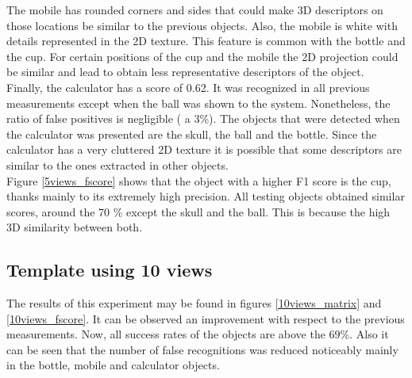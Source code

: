 	The mobile has rounded corners and sides that could make 3D descriptors on those locations be similar to the previous objects. 
	Also, the mobile is white with details represented in the 2D texture. 
	This feature is common with the bottle and the cup. 
	For certain positions of the cup and the mobile the 2D projection could be similar and lead to obtain less representative descriptors of the object. 
	\\
	Finally, the calculator has a score of 0.62. 
	It was recognized in all previous measurements except when the ball was shown to the system. 
	Nonetheless, the ratio of false positives is negligible ( a 3\%). 
	The objects that were detected when the calculator was presented are the skull, the ball and the bottle. 
	Since the calculator has a very cluttered 2D texture it is possible that some descriptors are similar to the ones extracted in other objects. 
	\\

	Figure \ref{5views_fscore} shows that the object with a higher F1 score is the cup, thanks mainly to its extremely high precision.  
	All testing objects obtained similar scores, around the 70 \% except the skull and the ball. 
	This is because the high 3D similarity between both. 


	\subsection{Template using 10 views}
	The results of this experiment may be found in figures \ref{10views_matrix} and \ref{10views_fscore}. 
	It can be observed an improvement with respect to the previous measurements. 
	Now, all success rates of the objects are above the 69\%. 
	Also it can be seen that the number of false recognitions was reduced noticeably mainly in the bottle, mobile and calculator objects. 
	\\

